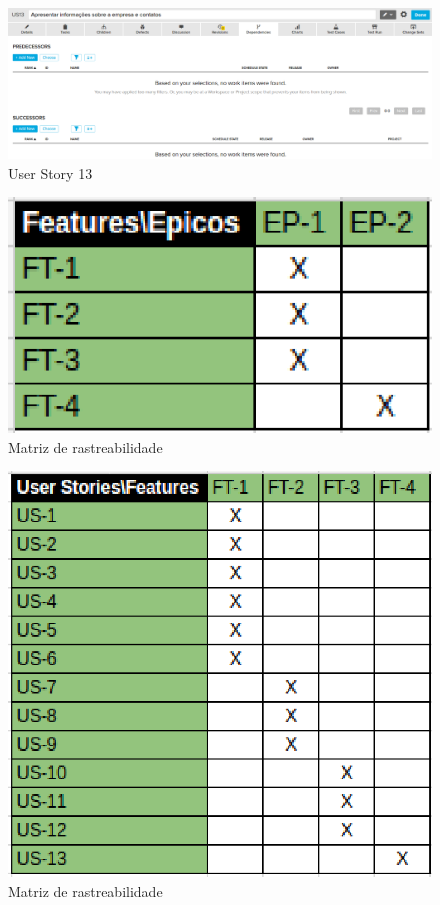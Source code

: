 \begin{figure}[h]
    \centering
    \label{fig01}
        \includegraphics[keepaspectratio=true,scale=0.3]{figuras/RallyDev/US13.eps}
    \caption{User Story 13}
\end{figure}

\begin{figure}[h]
    \centering
    \label{fig01}
        \includegraphics[keepaspectratio=true,scale=1]{figuras/RallyDev/matriz.eps}
    \caption{Matriz de rastreabilidade}
\end{figure}

\begin{figure}[h]
    \centering
    \label{fig01}
        \includegraphics[keepaspectratio=true,scale=0.9]{figuras/RallyDev/matriz2.eps}
    \caption{Matriz de rastreabilidade}
\end{figure}

